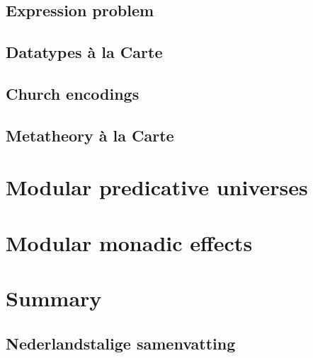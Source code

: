 \documentclass[final,twoside]{book}
\begin{document}
\section{Expression problem}
\section{Datatypes \`a la Carte}
\section{Church encodings}
\section{Metatheory \`a la Carte}

\chapter{Modular predicative universes}







\chapter{Modular monadic effects}





\backmatter

\chapter{Summary}


\begin{otherlanguage}{dutch}
\chapter{Nederlandstalige samenvatting}

\end{otherlanguage}




\listoffigures
\listoftables

\clearpage
{}
\printindex
\end{document}
